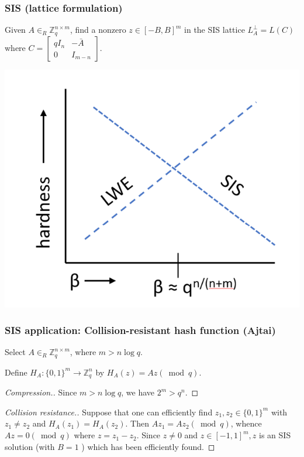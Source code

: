 \documentclass{beamer}
\begin{document}
\begin{frame}
\frametitle{SIS (lattice formulation)}
\begin{definition}
	 Given $A \in_R \mathbb{Z}_q^{n \times m}$, find a nonzero $z \in[-B, B]^m$ in the SIS lattice $L_A^{\perp}=L(C)$ where $C=\left[\begin{array}{cc}q I_n & -\bar{A} \\ 0 & I_{m-n}\end{array}\right]$.
\end{definition}
	\includegraphics[scale=0.6]{lwesishard.png}
\end{frame}

\begin{frame}
	\frametitle{SIS application: Collision-resistant hash function (Ajtai)}
	
\begin{definition}
Select $A \in_R \mathbb{Z}_q^{n \times m}$, where $m>n \log q$.

Define $H_A:\{0,1\}^m \longrightarrow \mathbb{Z}_q^n$ by $H_A(z)=A z (\bmod q)$.
	
\end{definition}

\begin{proof}[Compression.]
	 Since $m>n \log q$, we have $2^m>q^n$.
\end{proof}

\begin{proof}[Collision resistance.]
	 Suppose that one can efficiently find $z_1, z_2 \in\{0,1\}^m$ with $z_1 \neq z_2$ and $H_A\left(z_1\right)=H_A\left(z_2\right)$. Then $A z_1=A z_2(\bmod q)$, whence $A z=0(\bmod q)$ where $z=z_1-z_2$. Since $z \neq 0$ and $z \in[-1,1]^m, z$ is an SIS solution (with $B=1$ ) which has been efficiently found.
\end{proof}

\end{frame}
\end{document}
